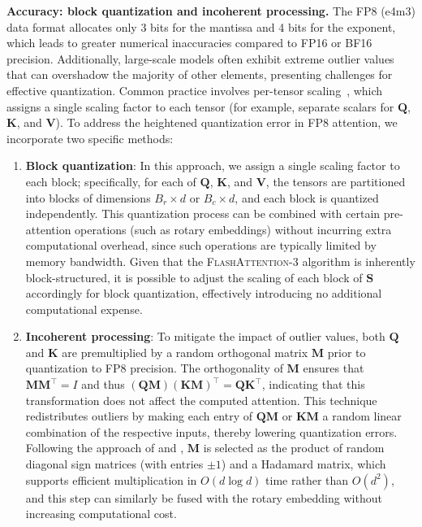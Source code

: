 \begin{enumerate}
\textbf{Accuracy: block quantization and incoherent processing.} The FP8 (e4m3) data format allocates only 3 bits for the mantissa and 4 bits for the exponent, which leads to greater numerical inaccuracies compared to FP16 or BF16 precision. Additionally, large-scale models often exhibit extreme outlier values~\citep{dettmers2208llm,
  sun2024massive} that can overshadow the majority of other elements, presenting challenges for effective quantization. Common practice involves per-tensor scaling~\citep{micikevicius2022fp8}, which assigns a single scaling factor to each tensor (for example, separate scalars for $\mathbf{Q}$, $\mathbf{K}$, and $\mathbf{V}$).
To address the heightened quantization error in FP8 attention, we incorporate two specific methods:

\begin{enumerate}

\item \textbf{Block quantization}: In this approach, we assign a single scaling factor to each block; specifically, for each of $\mathbf{Q}$, $\mathbf{K}$, and $\mathbf{V}$, the tensors are partitioned into blocks of dimensions $B_r \times d$ or $B_c \times d$, and each block is quantized independently. This quantization process can be combined with certain pre-attention operations (such as rotary embeddings) without incurring extra computational overhead, since such operations are typically limited by memory bandwidth. Given that the \textsc{FlashAttention-3} algorithm is inherently block-structured, it is possible to adjust the scaling of each block of $\mathbf{S}$ accordingly for block quantization, effectively introducing no additional computational expense.

\item \textbf{Incoherent processing}: To mitigate the impact of outlier values, both $\mathbf{Q}$ and $\mathbf{K}$ are premultiplied by a random orthogonal matrix $\mathbf{M}$ prior to quantization to FP8 precision. The orthogonality of $\mathbf{M}$ ensures that $\mathbf{M} \mathbf{M}^\top = I$ and thus $(\mathbf{Q} \mathbf{M})(\mathbf{K} \mathbf{M})^\top = \mathbf{Q}\mathbf{K}^\top$, indicating that this transformation does not affect the computed attention. This technique redistributes outliers by making each entry of $\mathbf{Q}\mathbf{M}$ or $\mathbf{K}\mathbf{M}$ a random linear combination of the respective inputs, thereby lowering quantization errors. Following the approach of \citet{chee2024quip} and \citet{tseng2024quip}, $\mathbf{M}$ is selected as the product of random diagonal sign matrices (with entries $\pm 1$) and a Hadamard matrix, which supports efficient multiplication in $O(d \log d)$ time rather than $O(d^2)$, and this step can similarly be fused with the rotary embedding without increasing computational cost.


\end{enumerate}
\end{enumerate}
